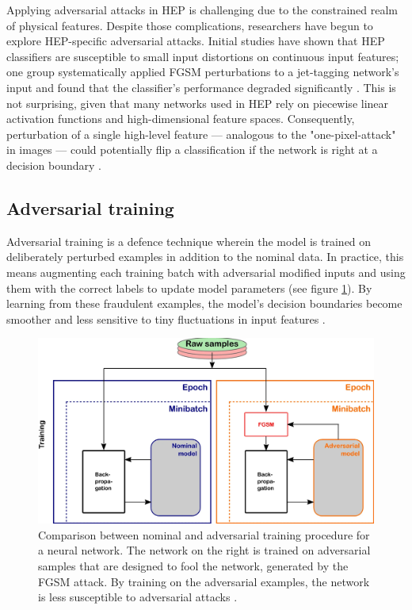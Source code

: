 Applying adversarial attacks in HEP is challenging due to the constrained realm of physical features. Despite those complications, researchers have begun to explore HEP-specific adversarial attacks. Initial studies have shown that HEP classifiers are susceptible to small input distortions on continuous input features; one group systematically applied FGSM perturbations to a jet-tagging network's input and found that the classifier's performance degraded significantly \cite{Stein2022}. This is not surprising, given that many networks used in HEP rely on piecewise linear activation functions and high-dimensional feature spaces. Consequently, perturbation of a single high-level feature — analogous to the "one-pixel-attack" in images — could potentially flip a classification if the network is right at a decision boundary \cite{Stein2022}.

\subsection{Adversarial training}

Adversarial training is a defence technique wherein the model is trained on deliberately perturbed examples in addition to the nominal data. In practice, this means augmenting each training batch with adversarial modified inputs and using them with the correct labels to update model parameters (see figure \ref{fig:adversarial_training}). By learning from these fraudulent examples, the model's decision boundaries become smoother and less sensitive to tiny fluctuations in input features \cite{goodfellow2015explainingharnessingadversarialexamples}.

\begin{figure}
    \centering
    \includegraphics[width=0.8\linewidth]{media/adversarial_training.png}
    \caption{Comparison between nominal and adversarial training procedure for a neural network. The network on the right is trained on adversarial samples that are designed to fool the network, generated by the FGSM attack. By training on the adversarial examples, the network is less susceptible to adversarial attacks \cite{Stein2022}.}
    \label{fig:adversarial_training}
\end{figure}

